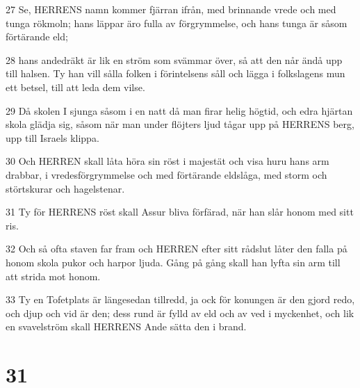 \par 27 Se, HERRENS namn kommer fjärran ifrån, med brinnande vrede och med tunga rökmoln; hans läppar äro fulla av förgrymmelse, och hans tunga är såsom förtärande eld;
\par 28 hans andedräkt är lik en ström som svämmar över, så att den når ändå upp till halsen. Ty han vill sålla folken i förintelsens såll och lägga i folkslagens mun ett betsel, till att leda dem vilse.
\par 29 Då skolen I sjunga såsom i en natt då man firar helig högtid, och edra hjärtan skola glädja sig, såsom när man under flöjters ljud tågar upp på HERRENS berg, upp till Israels klippa.
\par 30 Och HERREN skall låta höra sin röst i majestät och visa huru hans arm drabbar, i vredesförgrymmelse och med förtärande eldslåga, med storm och störtskurar och hagelstenar.
\par 31 Ty för HERRENS röst skall Assur bliva förfärad, när han slår honom med sitt ris.
\par 32 Och så ofta staven far fram och HERREN efter sitt rådslut låter den falla på honom skola pukor och harpor ljuda. Gång på gång skall han lyfta sin arm till att strida mot honom.
\par 33 Ty en Tofetplats är längesedan tillredd, ja ock för konungen är den gjord redo, och djup och vid är den; dess rund är fylld av eld och av ved i myckenhet, och lik en svavelström skall HERRENS Ande sätta den i brand.

\chapter{31}

